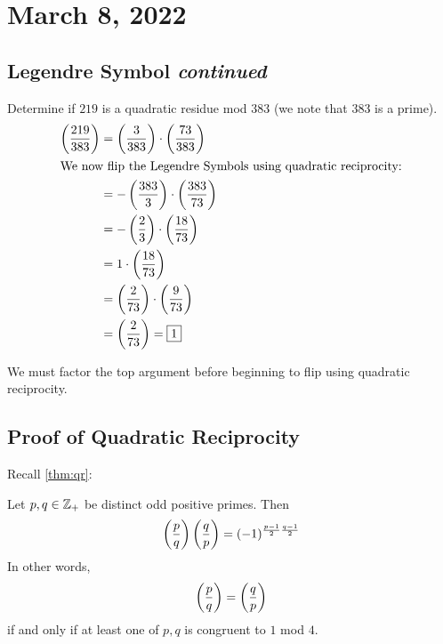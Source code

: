 \section{March 8, 2022}
\subsection{Legendre Symbol \emph{continued}}
\begin{example}
    Determine if $219$ is a quadratic residue mod $383$ (we note that $383$ is a prime).
    \begin{align*}
        \left(\dfrac{219}{383}\right) & = \left(\dfrac{3}{383}\right)\cdot\left(\dfrac{73}{383}\right)    \\
        \intertext{We now flip the Legendre Symbols using quadratic reciprocity:}
                        & = -\left(\dfrac{383}{3}\right) \cdot \left(\dfrac{383}{73}\right) \\
                        & = -\left(\dfrac{2}{3}\right) \cdot \left(\dfrac{18}{73}\right)    \\
                        & = 1\cdot \left(\dfrac{18}{73}\right)                \\
                        & = \left(\dfrac{2}{73}\right)\cdot\left(\dfrac{9}{73}\right)       \\
                        & = \left(\dfrac{2}{73}\right) = \boxed{1}
    \end{align*}
\end{example}
\begin{remark*}
    We must factor the top argument before beginning to flip using quadratic reciprocity.
\end{remark*}

\subsection{Proof of Quadratic Reciprocity}

Recall \cref{thm:qr}:
\begin{theorem*}
    Let $p, q\in\mathbb Z_+$ be distinct odd positive primes. Then
    \begin{equation*}
        \left(\dfrac{p}{q}\right)\left(\dfrac{q}{p}\right) = (-1)^{\frac{p-1}{2}\frac{q-1}{2}}
    \end{equation*}
    In other words,
    \[\left(\dfrac{p}{q}\right) = \left(\dfrac{q}{p}\right)\]
    if and only if at least one of $p, q$ is congruent to $1$ mod $4$.
\end{theorem*}

